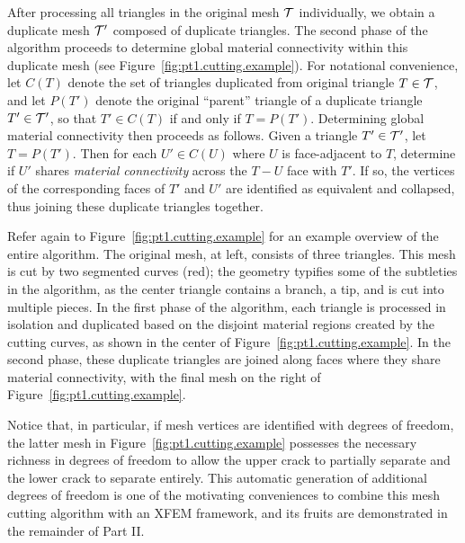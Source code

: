 After processing all triangles in the original mesh $\mathcal{T}$ individually, we obtain a duplicate mesh $\mathcal{T}'$ composed of duplicate triangles. The second phase of the algorithm proceeds to determine global material connectivity within this duplicate mesh (see Figure~\ref{fig:pt1.cutting.example}). For notational convenience, let $C(T)$ denote the set of triangles duplicated from original triangle $T \in \mathcal{T}$, and let $P(T')$ denote the original ``parent'' triangle of a duplicate triangle $T' \in \mathcal{T}'$, so that $T' \in C(T)$ if and only if $T = P(T')$. Determining global material connectivity then proceeds as follows. Given a triangle $T' \in \mathcal{T}'$, let $T = P(T')$. Then for each $U' \in C(U)$ where $U$ is face-adjacent to $T$, determine if $U'$ shares \emph{material connectivity} across the $T-U$ face with $T'$. If so, the vertices of the corresponding faces of $T'$ and $U'$ are identified as equivalent and collapsed, thus joining these duplicate triangles together.

Refer again to Figure~\ref{fig:pt1.cutting.example} for an example overview of the entire algorithm. The original mesh, at left, consists of three triangles. This mesh is cut by two segmented curves (red); the geometry typifies some of the subtleties in the algorithm, as the center triangle contains a branch, a tip, and is cut into multiple pieces. In the first phase of the algorithm, each triangle is processed in isolation and duplicated based on the disjoint material regions created by the cutting curves, as shown in the center of Figure~\ref{fig:pt1.cutting.example}. In the second phase, these duplicate triangles are joined along faces where they share material connectivity, with the final mesh on the right of Figure~\ref{fig:pt1.cutting.example}.

Notice that, in particular, if mesh vertices are identified with degrees of freedom, the latter mesh in Figure~\ref{fig:pt1.cutting.example} possesses the necessary richness in degrees of freedom to allow the upper crack to partially separate and the lower crack to separate entirely. This automatic generation of additional degrees of freedom is one of the motivating conveniences to combine this mesh cutting algorithm with an XFEM framework, and its fruits are demonstrated in the remainder of Part II.

\renewcommand{\thechapter}{\arabic{chapter}}

